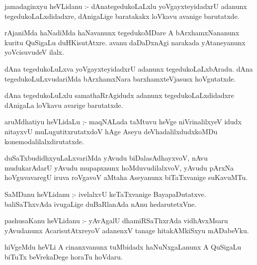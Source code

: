 \documentclass{article}
\begin{document}
\begin{mn}
jamadaginxyu  heVLidanu :- dAnategedukoLaLxlu  yoVgayxteyidadxrU  adanunx  
tegedukoLaLxdidadxre,  dAnigaLige  baratakakx  loVkavu  avanige  barutatxde.
\end{mn}

\begin{mn}
rAjaniMda  haNadiMda  haNavanunx  tegedukoMDare    A  bArxhamxNananunx  kuritu  
QuSigaLu  duHKisutAtxre.  avanu  daDaDxnAgi  narakada  yAtaneyanunx  yoVcisuvudeV  ilalx.
\end{mn}

\begin{mn}
dAna tegedukoLuLxva  yoVgayxteyidadxrU  adanunx  tegedukoLaLxbAradu.  dAna  
tegedukoLuLxvudariMda  bArxhamxNara  barxhamxteVjasusx  hoVgutatxde.
\end{mn}

\begin{mn}
dAna  tegedukoLuLxlu  samathaRrAgidudx  adanunx  tegedukoLaLxdidadxre  
dAnigaLa  loVkavu  avarige  barutatxde. 
\end{mn}

\begin{mn}
aruMdhatiyu  heVLidaLu ;- maqNALada  taMtuvu  heVge  niVrinalilxyeV  idudx  nitayxvU  
muLugutitxrutatxdoV  hAge  Aseyu  deVhadalilxdudxkoMDu  konemodalilalxdirutatxde.
\end{mn}

\begin{mn}
duSaTxbudidhxyuLaLxvariMda  yAvudu  biDalasAdhayxvoV,  nAvu  mudukarAdarU  yAvudu  
mupapxnunx  hoMduvudilalxvoV,  yAvudu  pArxNa hoVguvavaregU  iruva  roVgavoV  aMtaha  
Aseyanunx  biTaTxvanige  suKavuMTu.
\end{mn}

\begin{mn}
SaMDanu  heVLidanu ;- ivelalxvU  keTaTxvanige  BayapaDutatxve.  baliSaThxvAda  ivugaLige  
duBaRlanAda  nAnu  hedarutetxVne.
\end{mn}

\begin{mn}
pashusaKanu  heVLidanu :-  yAvAgalU  dhamiRSaThxrAda  vidhAvxMsaru  yAvudanunx  
AcarisutAtxreyoV  adanenxV  tanage  hitakAMkiSxyu  mADabeVku.  
\end{mn}

\begin{mn}
hiVgeMdu heVLi  A  cinanxvanunx  tuMbidadx haNuNxgaLanunx  A  QuSigaLu  biTuTx  beVrekaDege  horaTu  hoVdaru.
\end{mn}
\end{document}

